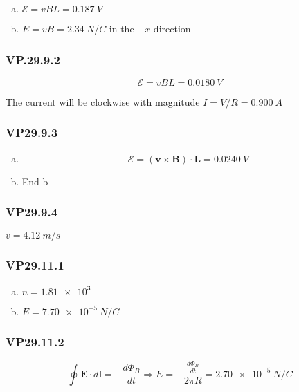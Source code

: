 \documentclass{article}
\begin{document}
\begin{enumerate}[(a)]
  \item $\mathcal{E} = v B L = \qty{0.187}{V}$

  \item $E = v B = \qty{2.34}{N/C}$ in the $+x$ direction
\end{enumerate}

\subsubsection{VP.29.9.2}

\[\mathcal{E} = v B L = \qty{0.0180}{V}\]

The current will be clockwise with magnitude $I = V / R = \qty{0.900}{A}$

\subsubsection{VP29.9.3}

\begin{enumerate}[(a)]
  \item \[\mathcal{E} = (\mathbf{v} \times \mathbf{B}) \cdot \mathbf{L} = \qty{0.0240}{V}\]

  \item End b
\end{enumerate}

\subsubsection{VP29.9.4}

$v = \qty{4.12}{m/s}$

\subsubsection{VP29.11.1}

\begin{enumerate}[(a)]
  \item $n = \num{1.81e3}$

  \item $E = \qty{7.70e-5}{N/C}$
\end{enumerate}

\subsubsection{VP29.11.2}

\[\oint \mathbf{E} \cdot d \mathbf{l} = -\frac{d \Phi_B}{dt} \Rightarrow E = -\frac{\frac{d \Phi_B}{dt}}{2 \pi R} = \qty{2.70e-5}{N/C}\]
\end{document}
